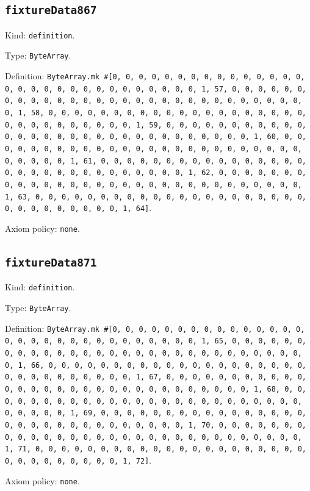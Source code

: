 \documentclass[11pt]{article}
\begin{document}
\subsection*{\texttt{fixtureData867}}
\noindent Kind: \texttt{definition}.\par
\noindent Type: \texttt{ByteArray}.\par
\noindent Definition: \texttt{ByteArray.mk \#[0, 0, 0, 0, 0, 0, 0, 0, 0, 0, 0, 0, 0, 0, 0, 0, 0, 0, 0, 0, 0, 0, 0, 0, 0, 0, 0, 0, 0, 0, 1, 57, 0, 0, 0, 0, 0, 0, 0, 0, 0, 0, 0, 0, 0, 0, 0, 0, 0, 0, 0, 0, 0, 0, 0, 0, 0, 0, 0, 0, 0, 0, 1, 58, 0, 0, 0, 0, 0, 0, 0, 0, 0, 0, 0, 0, 0, 0, 0, 0, 0, 0, 0, 0, 0, 0, 0, 0, 0, 0, 0, 0, 0, 0, 1, 59, 0, 0, 0, 0, 0, 0, 0, 0, 0, 0, 0, 0, 0, 0, 0, 0, 0, 0, 0, 0, 0, 0, 0, 0, 0, 0, 0, 0, 0, 0, 1, 60, 0, 0, 0, 0, 0, 0, 0, 0, 0, 0, 0, 0, 0, 0, 0, 0, 0, 0, 0, 0, 0, 0, 0, 0, 0, 0, 0, 0, 0, 0, 1, 61, 0, 0, 0, 0, 0, 0, 0, 0, 0, 0, 0, 0, 0, 0, 0, 0, 0, 0, 0, 0, 0, 0, 0, 0, 0, 0, 0, 0, 0, 0, 1, 62, 0, 0, 0, 0, 0, 0, 0, 0, 0, 0, 0, 0, 0, 0, 0, 0, 0, 0, 0, 0, 0, 0, 0, 0, 0, 0, 0, 0, 0, 0, 1, 63, 0, 0, 0, 0, 0, 0, 0, 0, 0, 0, 0, 0, 0, 0, 0, 0, 0, 0, 0, 0, 0, 0, 0, 0, 0, 0, 0, 0, 0, 0, 1, 64]}.\par
\noindent Axiom policy: \texttt{none}.\par
\subsection*{\texttt{fixtureData871}}
\noindent Kind: \texttt{definition}.\par
\noindent Type: \texttt{ByteArray}.\par
\noindent Definition: \texttt{ByteArray.mk \#[0, 0, 0, 0, 0, 0, 0, 0, 0, 0, 0, 0, 0, 0, 0, 0, 0, 0, 0, 0, 0, 0, 0, 0, 0, 0, 0, 0, 0, 0, 1, 65, 0, 0, 0, 0, 0, 0, 0, 0, 0, 0, 0, 0, 0, 0, 0, 0, 0, 0, 0, 0, 0, 0, 0, 0, 0, 0, 0, 0, 0, 0, 1, 66, 0, 0, 0, 0, 0, 0, 0, 0, 0, 0, 0, 0, 0, 0, 0, 0, 0, 0, 0, 0, 0, 0, 0, 0, 0, 0, 0, 0, 0, 0, 1, 67, 0, 0, 0, 0, 0, 0, 0, 0, 0, 0, 0, 0, 0, 0, 0, 0, 0, 0, 0, 0, 0, 0, 0, 0, 0, 0, 0, 0, 0, 0, 1, 68, 0, 0, 0, 0, 0, 0, 0, 0, 0, 0, 0, 0, 0, 0, 0, 0, 0, 0, 0, 0, 0, 0, 0, 0, 0, 0, 0, 0, 0, 0, 1, 69, 0, 0, 0, 0, 0, 0, 0, 0, 0, 0, 0, 0, 0, 0, 0, 0, 0, 0, 0, 0, 0, 0, 0, 0, 0, 0, 0, 0, 0, 0, 1, 70, 0, 0, 0, 0, 0, 0, 0, 0, 0, 0, 0, 0, 0, 0, 0, 0, 0, 0, 0, 0, 0, 0, 0, 0, 0, 0, 0, 0, 0, 0, 1, 71, 0, 0, 0, 0, 0, 0, 0, 0, 0, 0, 0, 0, 0, 0, 0, 0, 0, 0, 0, 0, 0, 0, 0, 0, 0, 0, 0, 0, 0, 0, 1, 72]}.\par
\noindent Axiom policy: \texttt{none}.\par
\end{document}
